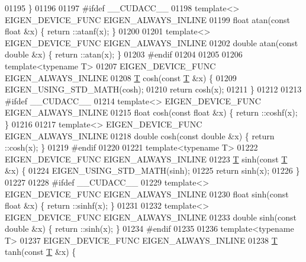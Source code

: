 \begin{DoxyCode}
01195 \}
01196 
01197 \textcolor{preprocessor}{#ifdef \_\_CUDACC\_\_}
01198 \textcolor{keyword}{template}<> EIGEN\_DEVICE\_FUNC EIGEN\_ALWAYS\_INLINE
01199 \textcolor{keywordtype}{float} atan(\textcolor{keyword}{const} \textcolor{keywordtype}{float} &x) \{ return ::atanf(x); \}
01200 
01201 \textcolor{keyword}{template}<> EIGEN\_DEVICE\_FUNC EIGEN\_ALWAYS\_INLINE
01202 \textcolor{keywordtype}{double} atan(\textcolor{keyword}{const} \textcolor{keywordtype}{double} &x) \{ return ::atan(x); \}
01203 \textcolor{preprocessor}{#endif}
01204 
01205 
01206 \textcolor{keyword}{template}<\textcolor{keyword}{typename} T>
01207 EIGEN\_DEVICE\_FUNC EIGEN\_ALWAYS\_INLINE
01208 \hyperlink{group___sparse_core___module_class_eigen_1_1_triplet}{T} cosh(\textcolor{keyword}{const} \hyperlink{group___sparse_core___module_class_eigen_1_1_triplet}{T} &x) \{
01209   EIGEN\_USING\_STD\_MATH(cosh);
01210   \textcolor{keywordflow}{return} cosh(x);
01211 \}
01212 
01213 \textcolor{preprocessor}{#ifdef \_\_CUDACC\_\_}
01214 \textcolor{keyword}{template}<> EIGEN\_DEVICE\_FUNC EIGEN\_ALWAYS\_INLINE
01215 \textcolor{keywordtype}{float} cosh(\textcolor{keyword}{const} \textcolor{keywordtype}{float} &x) \{ return ::coshf(x); \}
01216 
01217 \textcolor{keyword}{template}<> EIGEN\_DEVICE\_FUNC EIGEN\_ALWAYS\_INLINE
01218 \textcolor{keywordtype}{double} cosh(\textcolor{keyword}{const} \textcolor{keywordtype}{double} &x) \{ return ::cosh(x); \}
01219 \textcolor{preprocessor}{#endif}
01220 
01221 \textcolor{keyword}{template}<\textcolor{keyword}{typename} T>
01222 EIGEN\_DEVICE\_FUNC EIGEN\_ALWAYS\_INLINE
01223 \hyperlink{group___sparse_core___module_class_eigen_1_1_triplet}{T} sinh(\textcolor{keyword}{const} \hyperlink{group___sparse_core___module_class_eigen_1_1_triplet}{T} &x) \{
01224   EIGEN\_USING\_STD\_MATH(sinh);
01225   \textcolor{keywordflow}{return} sinh(x);
01226 \}
01227 
01228 \textcolor{preprocessor}{#ifdef \_\_CUDACC\_\_}
01229 \textcolor{keyword}{template}<> EIGEN\_DEVICE\_FUNC EIGEN\_ALWAYS\_INLINE
01230 \textcolor{keywordtype}{float} sinh(\textcolor{keyword}{const} \textcolor{keywordtype}{float} &x) \{ return ::sinhf(x); \}
01231 
01232 \textcolor{keyword}{template}<> EIGEN\_DEVICE\_FUNC EIGEN\_ALWAYS\_INLINE
01233 \textcolor{keywordtype}{double} sinh(\textcolor{keyword}{const} \textcolor{keywordtype}{double} &x) \{ return ::sinh(x); \}
01234 \textcolor{preprocessor}{#endif}
01235 
01236 \textcolor{keyword}{template}<\textcolor{keyword}{typename} T>
01237 EIGEN\_DEVICE\_FUNC EIGEN\_ALWAYS\_INLINE
01238 \hyperlink{group___sparse_core___module_class_eigen_1_1_triplet}{T} tanh(\textcolor{keyword}{const} \hyperlink{group___sparse_core___module_class_eigen_1_1_triplet}{T} &x) \{

\end{DoxyCode}
